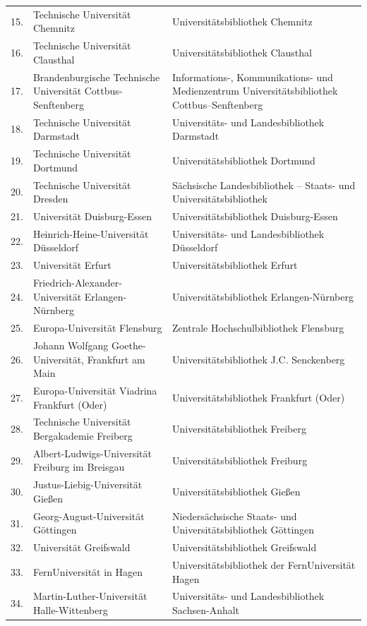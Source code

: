 \documentclass[a4paper,
fontsize=11pt,
oneside,
numbers=noperiodatend,
parskip=half-,
bibliography=totoc,
final
]{scrartcl}
\begin{document}
\begin{longtable}[l]{rp{7cm}p{7.5cm}}
15. & Technische Universität Chemnitz & Universitätsbibliothek Chemnitz \\
16. & Technische Universität Clausthal & Universitätsbibliothek Clausthal \\
17. & Brandenburgische Technische Universität Cottbus-Senftenberg & Informations-, Kommunikations- und Medienzentrum Universitätsbibliothek Cottbus--Senftenberg \\
18. & Technische Universität Darmstadt & Universitäts- und Landesbibliothek Darmstadt \\
19. & Technische Universität Dortmund & Universitätsbibliothek Dortmund \\
20. & Technische Universität Dresden & Sächsische Landesbibliothek -- Staats- und Universitätsbibliothek \\
21. & Universität Duisburg-Essen & Universitätsbibliothek Duisburg-Essen \\
22. & Heinrich-Heine-Universität Düsseldorf & Universitäts- und Landesbibliothek Düsseldorf \\
23. & Universität Erfurt & Universitätsbibliothek Erfurt \\
24. & Friedrich-Alexander-Universität Erlangen-Nürnberg & Universitätsbibliothek Erlangen-Nürnberg \\
25. & Europa-Universität Flensburg & Zentrale Hochschulbibliothek Flensburg \\
26. & Johann Wolfgang Goethe-Universität, Frankfurt am Main & Universitätsbibliothek J.C. Senckenberg \\
27. & Europa-Universität Viadrina Frankfurt (Oder) & Universitätsbibliothek Frankfurt (Oder) \\
28. & Technische Universität Bergakademie Freiberg & Universitätsbibliothek Freiberg \\
29. & Albert-Ludwigs-Universität Freiburg im Breisgau & Universitätsbibliothek Freiburg \\
30. & Justus-Liebig-Universität Gießen & Universitätsbibliothek Gießen \\
31. & Georg-August-Universität Göttingen & Niedersächsische Staats- und Universitätsbibliothek Göttingen \\
32. & Universität Greifswald & Universitätsbibliothek Greifswald \\
33. & FernUniversität in Hagen & Universitätsbibliothek der FernUniversität Hagen \\
34. & Martin-Luther-Universität Halle-Wittenberg & Universitäts- und Landesbibliothek Sachsen-Anhalt \\

\end{longtable}
\end{document}
